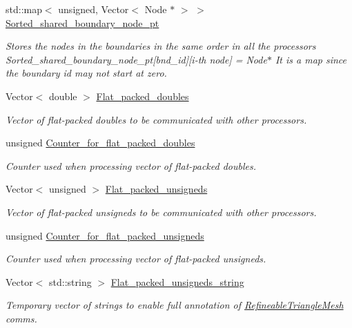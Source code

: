 \begin{DoxyCompactItemize}
std\+::map$<$ unsigned, Vector$<$ Node $\ast$ $>$ $>$ \hyperlink{classoomph_1_1RefineableTriangleMesh_ab22bada72171b4403ce2424a3f36b0d3}{Sorted\+\_\+shared\+\_\+boundary\+\_\+node\+\_\+pt}
\begin{DoxyCompactList}\small\item\em Stores the nodes in the boundaries in the same order in all the processors Sorted\+\_\+shared\+\_\+boundary\+\_\+node\+\_\+pt\mbox{[}bnd\+\_\+id\mbox{]}\mbox{[}i-\/th node\mbox{]} = Node$\ast$ It is a map since the boundary id may not start at zero. \end{DoxyCompactList}\item 
Vector$<$ double $>$ \hyperlink{classoomph_1_1RefineableTriangleMesh_afd370f91590e5f7e21194d58c00b6ba0}{Flat\+\_\+packed\+\_\+doubles}
\begin{DoxyCompactList}\small\item\em Vector of flat-\/packed doubles to be communicated with other processors. \end{DoxyCompactList}\item 
unsigned \hyperlink{classoomph_1_1RefineableTriangleMesh_a5fc09234e6d14789d597b40fd66b3d4f}{Counter\+\_\+for\+\_\+flat\+\_\+packed\+\_\+doubles}
\begin{DoxyCompactList}\small\item\em Counter used when processing vector of flat-\/packed doubles. \end{DoxyCompactList}\item 
Vector$<$ unsigned $>$ \hyperlink{classoomph_1_1RefineableTriangleMesh_a162fd7e805e4899cf4590cb5245849f2}{Flat\+\_\+packed\+\_\+unsigneds}
\begin{DoxyCompactList}\small\item\em Vector of flat-\/packed unsigneds to be communicated with other processors. \end{DoxyCompactList}\item 
unsigned \hyperlink{classoomph_1_1RefineableTriangleMesh_a5bb1b8a504779c77968538fe612a157d}{Counter\+\_\+for\+\_\+flat\+\_\+packed\+\_\+unsigneds}
\begin{DoxyCompactList}\small\item\em Counter used when processing vector of flat-\/packed unsigneds. \end{DoxyCompactList}\item 
Vector$<$ std\+::string $>$ \hyperlink{classoomph_1_1RefineableTriangleMesh_aff72d905fab5ad211c1f7d4b77d24149}{Flat\+\_\+packed\+\_\+unsigneds\+\_\+string}
\begin{DoxyCompactList}\small\item\em Temporary vector of strings to enable full annotation of \hyperlink{classoomph_1_1RefineableTriangleMesh}{Refineable\+Triangle\+Mesh} comms. \end{DoxyCompactList}\item 

\end{DoxyCompactItemize}

